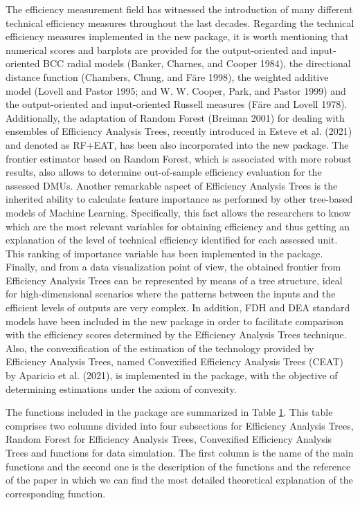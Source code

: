 The efficiency measurement field has witnessed the introduction of many different technical efficiency measures throughout the last decades. Regarding the technical efficiency measures implemented in the new  package, it is worth mentioning that numerical scores and barplots are provided for the output-oriented and input-oriented BCC radial models (Banker, Charnes, and Cooper 1984), the directional distance function (Chambers, Chung, and Färe 1998), the weighted additive model (Lovell and Pastor 1995; and W. W. Cooper, Park, and Pastor 1999) and the output-oriented and input-oriented Russell measures (Färe and Lovell 1978). Additionally, the adaptation of Random Forest (Breiman 2001) for dealing with ensembles of Efficiency Analysis Trees, recently introduced in Esteve et al. (2021) and denoted as RF+EAT, has been also incorporated into the new  package. The frontier estimator based on Random Forest, which is associated with more robust results, also allows to determine out-of-sample efficiency evaluation for the assessed DMUs. Another remarkable aspect of Efficiency Analysis Trees is the inherited ability to calculate feature importance as performed by other tree-based models of Machine Learning. Specifically, this fact allows the researchers to know which are the most relevant variables for obtaining efficiency and thus getting an explanation of the level of technical efficiency identified for each assessed unit. This ranking of importance variable has been implemented in the  package. Finally, and from a data visualization point of view, the obtained frontier from Efficiency Analysis Trees can be represented by means of a tree structure, ideal for high-dimensional scenarios where the patterns between the inputs and the efficient levels of outputs are very complex. In addition, FDH and DEA standard models have been included in the new package in order to facilitate comparison with the efficiency scores determined by the Efficiency Analysis Trees technique. Also, the convexification of the estimation of the technology provided by Efficiency Analysis Trees, named Convexified Efficiency Analysis Trees (CEAT) by Aparicio et al. (2021), is implemented in the  package, with the objective of determining estimations under the axiom of convexity.

The functions included in the  package are summarized in Table \hyperref[Tab:tab1]{1}. This table comprises two columns divided into four subsections for Efficiency Analysis Trees, Random Forest for Efficiency Analysis Trees, Convexified Efficiency Analysis Trees and functions for data simulation. The first column is the name of the main functions and the second one is the description of the functions and the reference of the paper in which we can find the most detailed theoretical explanation of the corresponding function.

